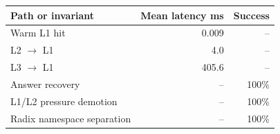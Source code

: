\begin{tabular}{lrr}
\toprule
Path or invariant & Mean latency ms & Success \\
\midrule
Warm L1 hit & 0.009 & -- \\
L2 $\rightarrow$ L1 & 4.0 & -- \\
L3 $\rightarrow$ L1 & 405.6 & -- \\
Answer recovery & -- & 100\% \\
L1/L2 pressure demotion & -- & 100\% \\
Radix namespace separation & -- & 100\% \\
\bottomrule
\end{tabular}
